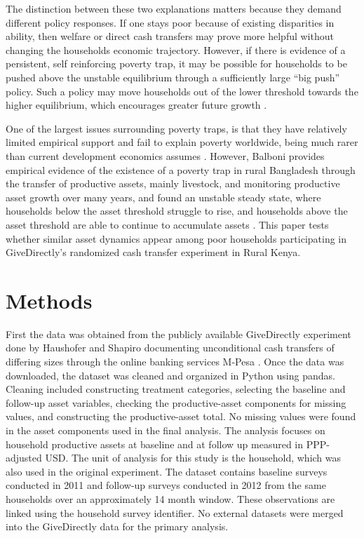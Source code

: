 \documentclass[9pt,twoside]{pnas-new}
\begin{document}
The distinction between these two explanations matters because they demand different policy responses. If one stays poor because of existing disparities in ability, then welfare or direct cash transfers may prove more helpful without changing the households economic trajectory. However, if there is evidence of a persistent, self
reinforcing poverty trap, it may be possible for households to be pushed above the unstable equilibrium through a sufficiently large ``big push'' policy. Such a policy may move households out of the
lower threshold towards the higher equilibrium, which encourages greater future growth
\cite{burgess2026}.


One of the largest issues surrounding poverty traps, is that they have relatively limited
empirical support and fail to explain poverty worldwide, being much rarer than current
development economics assumes \cite{kraay2014}. However, Balboni provides
empirical evidence of the existence of a poverty trap in rural Bangladesh through the transfer of
productive assets, mainly livestock, and monitoring productive asset growth over many years,
and found an unstable steady state, where households below the asset threshold struggle to rise, and
households above the asset threshold are able to continue to accumulate assets
\cite{balboni2022}. This paper tests whether similar asset dynamics appear among poor
households participating in GiveDirectly's randomized cash transfer experiment in Rural Kenya.



\section{Methods}

First the data was obtained from the publicly available GiveDirectly experiment done by Haushofer and Shapiro
documenting unconditional cash transfers of differing sizes through the online banking services
M-Pesa \cite{haushofer2016}. Once the data was downloaded, the dataset was
cleaned and organized in Python using pandas. Cleaning included constructing treatment categories, selecting the baseline and follow-up asset variables, checking the productive-asset components for missing values, and constructing the productive-asset total. No missing values were found in the asset components used in the final analysis. The analysis focuses on household productive
assets at baseline and at follow up measured in PPP-adjusted USD. The unit of analysis for this study is the household, which was also used in the original experiment. The dataset contains baseline surveys conducted in 2011 and follow-up surveys conducted in 2012  from the same households over an approximately 14 month window. These observations are linked using the household survey identifier. No external datasets were merged into the GiveDirectly data for the primary analysis.
\end{document}
